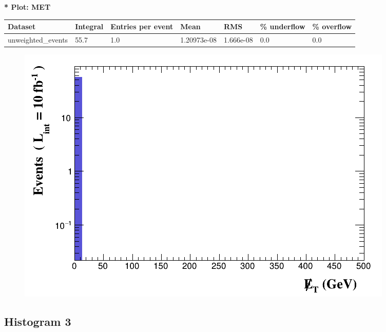 \documentclass[a4paper, 10pt]{article}
\begin{document}
\textbf{* Plot: MET}\\
   \begin{table}[H]
  \begin{center}
    \begin{tabular}{|m{23.0mm}|m{23.0mm}|m{18.0mm}|m{19.0mm}|m{19.0mm}|m{19.0mm}|m{19.0mm}|}
      \hline
      {\cellcolor{yellow}         Dataset}& {\cellcolor{yellow}         Integral}& {\cellcolor{yellow}         Entries per event}& {\cellcolor{yellow}         Mean}& {\cellcolor{yellow}         RMS}& {\cellcolor{yellow}         \% underflow}& {\cellcolor{yellow}         \% overflow}\\
      \hline
      {\cellcolor{white}         unweighted\_events}& {\cellcolor{white}         55.7}& {\cellcolor{white}         1.0}& {\cellcolor{white}         1.20973e-08}& {\cellcolor{white}         1.666e-08}& {\cellcolor{green}         0.0}& {\cellcolor{green}         0.0}\\
\hline
    \end{tabular}
  \end{center}
\end{table}

\begin{figure}[H]
  \begin{center}
    \includegraphics[scale=0.45]{selection_1.png}\\
\caption{   }
  \end{center}
\end{figure}
      \newpage
\subsection{ Histogram 3}
\end{document}
